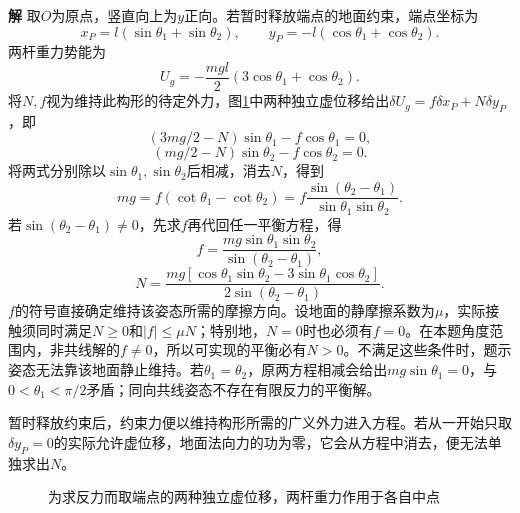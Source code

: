 \documentclass[11pt,openany,fontset=fandol]{ctexbook}
\theoremstyle{definition}\newtheorem{example}{例}[chapter]\newtheorem{exercise}{习题}[chapter]
\newcommand{\SolutionStart}{\par\medskip\ifdim\pagetotal>0pt\ifdim\dimexpr\pagegoal-\pagetotal\relax<3\baselineskip\newpage\fi\fi\noindent\textbf{解}\quad\ignorespaces}
\newenvironment{solution}{\SolutionStart}{\par\medskip}
\begin{document}
\begin{solution}
取$O$为原点，竖直向上为$y$正向。若暂时释放端点的地面约束，端点坐标为
\[
 x_P=l(\sin\theta_1+\sin\theta_2),\qquad
 y_P=-l(\cos\theta_1+\cos\theta_2).
\]
两杆重力势能为
\[
 U_g=-\frac{mgl}{2}(3\cos\theta_1+\cos\theta_2).
\]
将$N,f$视为维持此构形的待定外力，图\ref{mp5:fig:hw:l5-40-s}中两种独立虚位移给出$\delta U_g=f\delta x_P+N\delta y_P$，即
\[
 (3mg/2-N)\sin\theta_1-f\cos\theta_1=0,
\]
\[
 (mg/2-N)\sin\theta_2-f\cos\theta_2=0.
\]
将两式分别除以$\sin\theta_1,\sin\theta_2$后相减，消去$N$，得到
\[
mg=f(\cot\theta_1-\cot\theta_2)
=f\frac{\sin(\theta_2-\theta_1)}{\sin\theta_1\sin\theta_2}.
\]
若$\sin(\theta_2-\theta_1)\ne0$，先求$f$再代回任一平衡方程，得
\[
 \boxed{f=\frac{mg\sin\theta_1\sin\theta_2}
                   {\sin(\theta_2-\theta_1)}},
\]
\[
 \boxed{N=\frac{mg[\cos\theta_1\sin\theta_2
                    -3\sin\theta_1\cos\theta_2]}
                   {2\sin(\theta_2-\theta_1)}}.
\]
$f$的符号直接确定维持该姿态所需的摩擦方向。设地面的静摩擦系数为$\mu$，实际接触须同时满足$N\ge0$和$|f|\le\mu N$；特别地，$N=0$时也必须有$f=0$。在本题角度范围内，非共线解的$f\ne0$，所以可实现的平衡必有$N>0$。不满足这些条件时，题示姿态无法靠该地面静止维持。若$\theta_1=\theta_2$，原两方程相减会给出$mg\sin\theta_1=0$，与$0<\theta_1<\pi/2$矛盾；同向共线姿态不存在有限反力的平衡解。

暂时释放约束后，约束力便以维持构形所需的广义外力进入方程。若从一开始只取$\delta y_P=0$的实际允许虚位移，地面法向力的功为零，它会从方程中消去，便无法单独求出$N$。


\begin{figure}[H]\centering
{}
\caption{为求反力而取端点的两种独立虚位移，两杆重力作用于各自中点}\label{mp5:fig:hw:l5-40-s}
\end{figure}

\end{solution}
\end{document}
